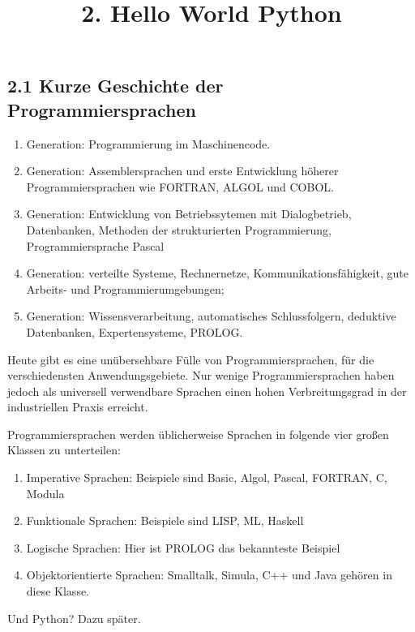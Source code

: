 \documentclass[
  11pt,
  a4paper,
  DIV=11,
  numbers=noendperiod]{scrartcl}
\title{2. Hello World Python}
\author{}
\date{}
\begin{document}
\maketitle


\subsection{2.1 Kurze Geschichte der
Programmiersprachen}\label{kurze-geschichte-der-programmiersprachen}

\begin{enumerate}
\def\labelenumi{\arabic{enumi}.}
\item
  Generation: Programmierung im Maschinencode.
\item
  Generation: Assemblersprachen und erste Entwicklung höherer
  Programmiersprachen wie FORTRAN, ALGOL und COBOL.
\item
  Generation: Entwicklung von Betriebssytemen mit Dialogbetrieb,
  Datenbanken, Methoden der strukturierten Programmierung,
  Programmiersprache Pascal
\item
  Generation: verteilte Systeme, Rechnernetze, Kommunikationsfähigkeit,
  gute Arbeits- und Programmierumgebungen;
\item
  Generation: Wissensverarbeitung, automatisches Schlussfolgern,
  deduktive Datenbanken, Expertensysteme, PROLOG.
\end{enumerate}

Heute gibt es eine unübersehbare Fülle von Programmiersprachen, für die
verschiedensten Anwendungsgebiete. Nur wenige Programmiersprachen haben
jedoch als universell verwendbare Sprachen einen hohen Verbreitungsgrad
in der industriellen Praxis erreicht.

Programmiersprachen werden üblicherweise Sprachen in folgende vier
großen Klassen zu unterteilen:

\begin{enumerate}
\def\labelenumi{\arabic{enumi}.}
\item
  Imperative Sprachen: Beispiele sind Basic, Algol, Pascal, FORTRAN, C,
  Modula
\item
  Funktionale Sprachen: Beispiele sind LISP, ML, Haskell
\item
  Logische Sprachen: Hier ist PROLOG das bekannteste Beispiel
\item
  Objektorientierte Sprachen: Smalltalk, Simula, C++ und Java gehören in
  diese Klasse.
\end{enumerate}

Und Python? Dazu später.
\end{document}
